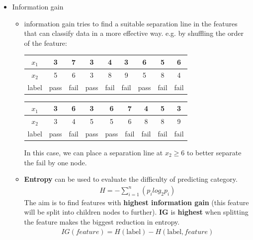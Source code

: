 \documentclass[a4paper,10pt]{article}
\begin{document}
\begin{itemize}
    \item Information gain
        \begin{itemize}
            \item information gain tries to find a suitable separation line in the features that can classify data in a more effective way. e.g. by shuffling the order of the feature:
            \begin{table}[hbt]
                \centering
                \begin{tabular}{|c|c|c|c|c|c|c|c|c|}
                \hline
                $x_1$ & 3 & 7 & 3 & 4 & 3 & 6 & 5 & 6 \\ \hline
                $x_2$ & 5 & 6 & 3 & 8 & 9 & 5 & 8 & 4 \\ \hline
                label & pass & fail & pass & fail & fail & pass & fail & fail \\ \hline
                \end{tabular}
            \end{table}
            \begin{table}[hbt]
                \centering
                \begin{tabular}{|c|c|c|c|c|c|c|c|c|}
                \hline
                $x_1$ & 3 & 6 & 3 & 6 & 7 & 4 & 5 & 3 \\ \hline
                $x_2$ & 3 & 4 & 5 & 5 & 6 & 8 & 8 & 9 \\ \hline
                label & pass & fail & pass & pass & fail & fail & fail & fail \\ \hline
                \end{tabular}
            \end{table}
            In this case, we can place a separation line at $x_2\geq6$ to better separate the fail by one node. 
            \item \textbf{Entropy} can be used to evaluate the difficulty of predicting category.
            \begin{gather*}
                H = -\sum_{i = 1}^{n}(p_i log_2p_i)
            \end{gather*}
            The aim is to find features with \textbf{highest information gain} (this feature will be split into children nodes to further). \textbf{IG} is \textbf{highest} when splitting the feature makes the biggest reduction in entropy.
            \begin{gather*}
                IG(feature) = H(\text{label}) - H(\text{label}, feature)
            \end{gather*}

\end{itemize}
\end{itemize}
\end{document}
